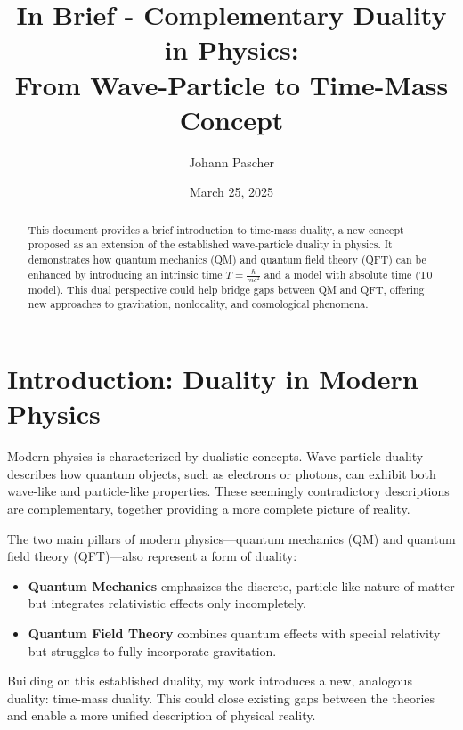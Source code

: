 \documentclass[a4paper,12pt]{article}
\begin{document}
	
	\title{In Brief - Complementary Duality in Physics: \\ From Wave-Particle to Time-Mass Concept}
	\author{Johann Pascher}
	\date{March 25, 2025}
	\maketitle
	
	\begin{abstract}
		This document provides a brief introduction to time-mass duality, a new concept proposed as an extension of the established wave-particle duality in physics. It demonstrates how quantum mechanics (QM) and quantum field theory (QFT) can be enhanced by introducing an intrinsic time \( T = \frac{\hbar}{mc^2} \) and a model with absolute time (T0 model). This dual perspective could help bridge gaps between QM and QFT, offering new approaches to gravitation, nonlocality, and cosmological phenomena.
	\end{abstract}
	
	\tableofcontents
	\newpage
	
	\section{Introduction: Duality in Modern Physics}
	
	Modern physics is characterized by dualistic concepts. Wave-particle duality describes how quantum objects, such as electrons or photons, can exhibit both wave-like and particle-like properties. These seemingly contradictory descriptions are complementary, together providing a more complete picture of reality.
	
	The two main pillars of modern physics—quantum mechanics (QM) and quantum field theory (QFT)—also represent a form of duality:
	\begin{itemize}
		\item \textbf{Quantum Mechanics} emphasizes the discrete, particle-like nature of matter but integrates relativistic effects only incompletely.
		\item \textbf{Quantum Field Theory} combines quantum effects with special relativity but struggles to fully incorporate gravitation.
	\end{itemize}
	
	Building on this established duality, my work \cite{pascher_planck_2025} introduces a new, analogous duality: time-mass duality. This could close existing gaps between the theories and enable a more unified description of physical reality.
	
\end{document}
